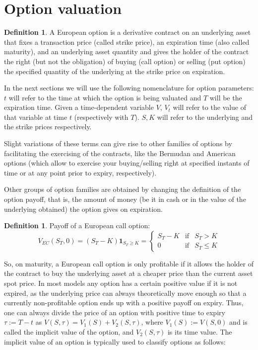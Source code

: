 \documentclass[12,twoside]{mammeTFM}
\theoremstyle{definition}
\newtheorem{definition}[thm]{Definition}
\theoremstyle{remark}
\begin{document}
\section{Option valuation}\label{chapter:option_valuation}

\begin{definition}
A European option is a derivative contract on an underlying asset that fixes a transaction price (called strike price), an expiration time (also called maturity), and an underlying asset quantity and gives the holder of the contract the right (but not the obligation) of buying (call option) or selling (put option) the specified quantity of the underlying at the strike price on expiration.
\end{definition}

In the next sections we will use the following nomenclature for option parameters: $t$ will refer to the time at which the option is being valuated and $T$ will be the expiration time. Given a time-dependent variable $V$, $V_t$ will refer to the value of that variable at time $t$ (respectively with $T$). $S, K$ will refer to the underlying and the strike prices respectively.

Slight variations of these terms can give rise to other families of options by facilitating the exercising of the contracts, like the Bermudan and American options (which allow to exercise your buying/selling right at specified instants of time or at any point prior to expiry, respectively).

Other groups of option families are obtained by changing the definition of the option payoff, that is, the amount of money (be it in cash or in the value of the underlying obtained) the option gives on expiration.

\begin{definition} Payoff of a European call option:
\begin{equation} \label{eq:european_call_payoff}
V_{EC}(S_T, 0) = (S_T - K)\boldsymbol{1}_{S_T \geq K} = \left\{ \begin{array}{rcl}
S_T - K & \mbox{if} & S_T > K \\ 
0 & \mbox{if} & S_T\leq K
\end{array}\right.
\end{equation} 
\end{definition}

So, on maturity, a European call option is only profitable if it allows the holder of the contract to buy the underlying asset at a cheaper price than the current asset spot price. In most models any option has a certain positive value if it is not expired, as the underlying price can always theoretically move enough so that a currently non-profitable option ends up with a positive payoff on expiry. Thus, one can always divide the price of an option with positive time to expiry $\tau := T - t$ as $V(S,\tau) = V_1(S) + V_2(S, \tau)$, where $V_1(S) := V(S,0)$ and is called the implicit value of the option, and $V_2(S, \tau)$ is its time value. The implicit value of an option is typically used to classify options as follows:
\end{document}
